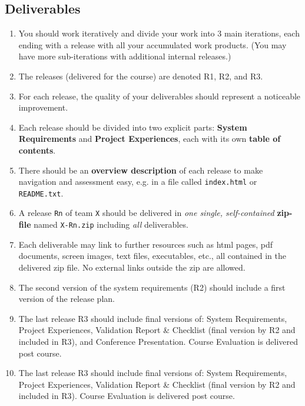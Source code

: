 \subsection{Deliverables}
  \begin{enumerate}[nolistsep]
    \item You should work iteratively and divide your work into 3 main iterations, each ending with a release with all your accumulated work products. (You may have more sub-iterations with additional internal releases.)
    \item The releases (delivered for the course) are denoted R1, R2, and R3.
    \item For each release, the quality of your deliverables should represent a noticeable improvement.
    \item Each release should be divided into two explicit parts: {\bf System Requirements} and {\bf Project Experiences}, each with its own {\bf table of contents}.
    \item There should be an {\bf overview description} of each release to make navigation and assessment easy, e.g. in a file called \verb+index.html+ or \verb+README.txt+.
    \item A release \verb+Rn+ of team \verb+X+ should be delivered in {\it one single, self-contained} {\bf zip-file} named \verb+X-Rn.zip+ including {\it all} deliverables.
    \item Each deliverable may link to further resources such as html pages, pdf documents, screen images, text files, executables, etc., all contained in the delivered zip file. No external links outside the zip are allowed.
\ifteknolog
    \item The second version of the system requirements (R2) should include a first version of the release plan.
    \item The last release R3 should include final versions of: System Requirements, Project Experiences, Validation Report \& Checklist (final version by R2 and included in R3), and Conference Presentation. Course Evaluation is delivered post course.
\else
    \item The last release R3 should include final versions of: System Requirements, Project Experiences, Validation Report \& Checklist (final version by R2 and included in R3). Course Evaluation is delivered post course.
\fi


\end{enumerate}
